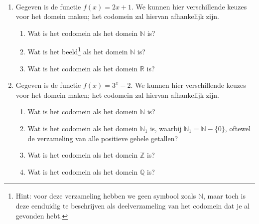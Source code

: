 \begin{exercise}\mbox{}\\
  \begin{enumerate}[label=\textbf{\alph*.}]
    \item Gegeven is de functie $f(x) = 2x + 1$. We kunnen hier verschillende keuzes voor het domein maken; het codomein zal hiervan afhankelijk zijn.
      \begin{enumerate}
        \item Wat is het codomein als het domein $\mathbb{N}$ is?
        \item Wat is het beeld\footnote{Hint: voor deze verzameling hebben we geen symbool zoals $\mathbb{N}$, maar toch is deze eenduidig te beschrijven als deelverzameling van het codomein dat je al gevonden hebt.} als het domein $\mathbb{N}$ is?
        \item Wat is het codomein als het domein $\mathbb{R}$ is?
      \end{enumerate}

    \item Gegeven is de functie $f(x) = 3^{x} - 2$. We kunnen hier verschillende keuzes voor het domein maken; het codomein zal hiervan afhankelijk zijn.
      \begin{enumerate}
        \item Wat is het codomein als het domein $\mathbb{N}$ is?
        \item Wat is het codomein als het domein $\mathbb{N}_{1}$ is, waarbij $\mathbb{N}_{1} = \mathbb{N} - \{0\}$, oftewel de verzameling van alle positieve gehele getallen?
        \item Wat is het codomein als het domein $\mathbb{Z}$ is?
        \item Wat is het codomein als het domein $\mathbb{Q}$ is?
      \end{enumerate}


  \end{enumerate}
\end{exercise}
